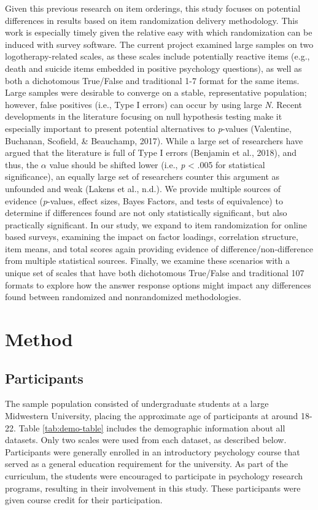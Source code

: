 \documentclass[english,man, mask]{apa6}
\theoremstyle{definition}
\theoremstyle{definition}
\theoremstyle{definition}
\theoremstyle{remark}
\begin{document}
Given this previous research on item orderings, this study focuses on
potential differences in results based on item randomization delivery
methodology. This work is especially timely given the relative easy with
which randomization can be induced with survey software. The current
project examined large samples on two logotherapy-related scales, as
these scales include potentially reactive items (e.g., death and suicide
items embedded in positive psychology questions), as well as both a
dichotomous True/False and traditional 1-7 format for the same items.
Large samples were desirable to converge on a stable, representative
population; however, false positives (i.e., Type I errors) can occur by
using large \emph{N}. Recent developments in the literature focusing on
null hypothesis testing make it especially important to present
potential alternatives to \emph{p}-values (Valentine, Buchanan,
Scofield, \& Beauchamp, 2017). While a large set of researchers have
argued that the literature is full of Type I errors (Benjamin et al.,
2018), and thus, the \(\alpha\) value should be shifted lower (i.e.,
\emph{p} \textless{} .005 for statistical significance), an equally
large set of researchers counter this argument as unfounded and weak
(Lakens et al., n.d.). We provide multiple sources of evidence
(\emph{p}-values, effect sizes, Bayes Factors, and tests of equivalence)
to determine if differences found are not only statistically
significant, but also practically significant. In our study, we expand
to item randomization for online based surveys, examining the impact on
factor loadings, correlation structure, item means, and total scores
again providing evidence of difference/non-difference from multiple
statistical sources. Finally, we examine these scenarios with a unique
set of scales that have both dichotomous True/False and traditional 107
formats to explore how the answer response options might impact any
differences found between randomized and nonrandomized methodologies.

\section{Method}\label{method}

\subsection{Participants}\label{participants}

The sample population consisted of undergraduate students at a large
Midwestern University, placing the approximate age of participants at
around 18-22. Table \ref{tab:demo-table} includes the demographic
information about all datasets. Only two scales were used from each
dataset, as described below. Participants were generally enrolled in an
introductory psychology course that served as a general education
requirement for the university. As part of the curriculum, the students
were encouraged to participate in psychology research programs,
resulting in their involvement in this study. These participants were
given course credit for their participation.
\end{document}
